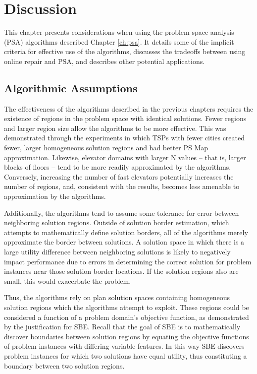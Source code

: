 \chapter{Discussion}
\thispagestyle{plain}

\label{ch:application}

This chapter presents considerations when using the problem space analysis  (PSA) algorithms described Chapter \ref{ch:psa}.  It details some of the implicit criteria  for effective use of the algorithms, discusses the tradeoffs between using online repair and PSA, and describes other potential applications.

\section{Algorithmic Assumptions}
\label{sec:algorithmic-assumptions}


The effectiveness of the algorithms described in the previous chapters requires the existence of regions in the problem space with identical solutions.  Fewer regions and larger region size allow the algorithms to be more effective.  This was demonstrated through the experiments in which  TSPs with fewer cities created fewer, larger homogeneous solution regions and had better PS Map approximation.  Likewise, elevator domains with larger N values -- that is, larger blocks of floors -- tend to be more readily approximated by the algorithms.  Conversely, increasing the number of fast elevators potentially increases the number of regions, and, consistent with the results, becomes less amenable to approximation by the algorithms.

Additionally, the algorithms tend to assume some tolerance for error between neighboring solution regions.  Outside of solution border estimation, which attempts to mathematically define solution borders, all of the algorithms merely approximate the border between solutions.  A solution space in which there is a large utility difference between neighboring solutions is likely to negatively impact performance due to errors in determining the correct solution for problem instances near those solution border locations.  If the solution regions also are small, this would exacerbate the problem.

Thus, the algorithms rely on plan solution spaces containing homogeneous solution regions which the algorithms attempt to exploit.  These regions could be considered a function of a problem domain's objective function, as demonstrated by the justification for SBE.  Recall that the goal of SBE is to mathematically discover boundaries between solution regions by equating the objective functions of problem instances with differing variable features.  In this way SBE discovers problem instances for which two solutions have equal utility, thus constituting a boundary between two solution regions.  

